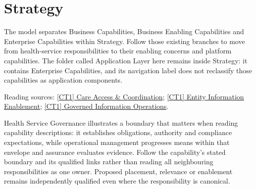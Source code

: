 \part{Strategy}
The model separates Business Capabilities, Business Enabling Capabilities and Enterprise Capabilities within Strategy. Follow those existing branches to move from health-service responsibilities to their enabling concerns and platform capabilities. The folder called Application Layer here remains inside Strategy: it contains Enterprise Capabilities, and its navigation label does not reclassify those capabilities as application components.

{\small Reading sources: \hyperref[element:ed342cb8656b4f80b55ad519ecbd2d3a]{[CT1] Care Access \& Coordination}; \hyperref[element:b5a92874f8ac4509a30af5253590edc1]{[CT1] Entity Information Enablement}; \hyperref[element:15e57021490c4e738aee9009ff84a7c3]{[CT1] Governed Information Operations}.}\par
Health Service Governance illustrates a boundary that matters when reading capability descriptions: it establishes obligations, authority and compliance expectations, while operational management progresses means within that envelope and assurance evaluates evidence. Follow the capability's stated boundary and its qualified links rather than reading all neighbouring responsibilities as one owner. Proposed placement, relevance or enablement remains independently qualified even where the responsibility is canonical.

